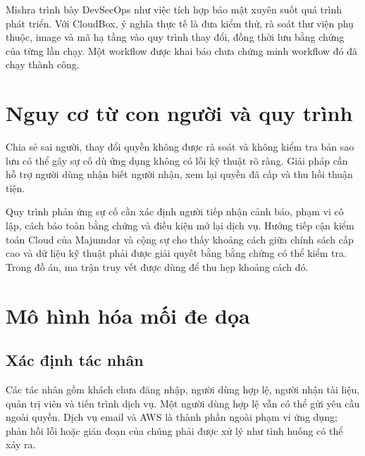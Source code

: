 Mishra trình bày DevSecOps như việc tích hợp bảo mật xuyên suốt quá trình phát triển. Với CloudBox, ý nghĩa thực tế là đưa kiểm thử, rà soát thư viện phụ thuộc, image và mã hạ tầng vào quy trình thay đổi, đồng thời lưu bằng chứng của từng lần chạy. Một workflow được khai báo chưa chứng minh workflow đó đã chạy thành công.\cite{mishra}

\section{Nguy cơ từ con người và quy trình}
Chia sẻ sai người, thay đổi quyền không được rà soát và không kiểm tra bản sao lưu có thể gây sự cố dù ứng dụng không có lỗi kỹ thuật rõ ràng. Giải pháp cần hỗ trợ người dùng nhận biết người nhận, xem lại quyền đã cấp và thu hồi thuận tiện.

Quy trình phản ứng sự cố cần xác định người tiếp nhận cảnh báo, phạm vi cô lập, cách bảo toàn bằng chứng và điều kiện mở lại dịch vụ. Hướng tiếp cận kiểm toán Cloud của Majumdar và cộng sự cho thấy khoảng cách giữa chính sách cấp cao và dữ liệu kỹ thuật phải được giải quyết bằng bằng chứng có thể kiểm tra. Trong đồ án, ma trận truy vết được dùng để thu hẹp khoảng cách đó.\cite{auditing}

\section{Mô hình hóa mối đe dọa}
\subsection{Xác định tác nhân}
Các tác nhân gồm khách chưa đăng nhập, người dùng hợp lệ, người nhận tài liệu, quản trị viên và tiến trình dịch vụ. Một người dùng hợp lệ vẫn có thể gửi yêu cầu ngoài quyền. Dịch vụ email và AWS là thành phần ngoài phạm vi ứng dụng; phản hồi lỗi hoặc gián đoạn của chúng phải được xử lý như tình huống có thể xảy ra.
